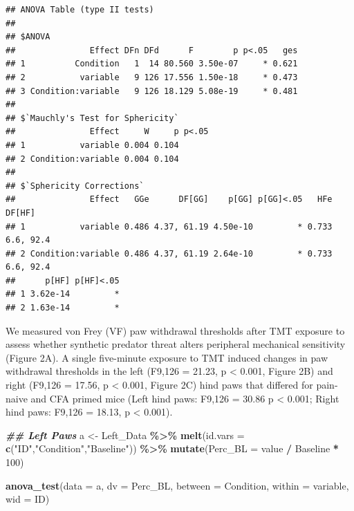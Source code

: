 \documentclass[
]{book}
\newenvironment{Shaded}{\begin{snugshade}}{\end{snugshade}}
\newcommand{\AttributeTok}[1]{\textcolor[rgb]{0.13,0.29,0.53}{#1}}
\newcommand{\DecValTok}[1]{\textcolor[rgb]{0.00,0.00,0.81}{#1}}
\newcommand{\DocumentationTok}[1]{\textcolor[rgb]{0.56,0.35,0.01}{\textbf{\textit{#1}}}}
\newcommand{\FunctionTok}[1]{\textcolor[rgb]{0.13,0.29,0.53}{\textbf{#1}}}
\newcommand{\NormalTok}[1]{#1}
\newcommand{\OtherTok}[1]{\textcolor[rgb]{0.56,0.35,0.01}{#1}}
\newcommand{\SpecialCharTok}[1]{\textcolor[rgb]{0.81,0.36,0.00}{\textbf{#1}}}
\newcommand{\StringTok}[1]{\textcolor[rgb]{0.31,0.60,0.02}{#1}}
\begin{document}
\begin{verbatim}
## ANOVA Table (type II tests)
## 
## $ANOVA
##               Effect DFn DFd      F        p p<.05   ges
## 1          Condition   1  14 80.560 3.50e-07     * 0.621
## 2           variable   9 126 17.556 1.50e-18     * 0.473
## 3 Condition:variable   9 126 18.129 5.08e-19     * 0.481
## 
## $`Mauchly's Test for Sphericity`
##               Effect     W     p p<.05
## 1           variable 0.004 0.104      
## 2 Condition:variable 0.004 0.104      
## 
## $`Sphericity Corrections`
##               Effect   GGe      DF[GG]    p[GG] p[GG]<.05   HFe    DF[HF]
## 1           variable 0.486 4.37, 61.19 4.50e-10         * 0.733 6.6, 92.4
## 2 Condition:variable 0.486 4.37, 61.19 2.64e-10         * 0.733 6.6, 92.4
##      p[HF] p[HF]<.05
## 1 3.62e-14         *
## 2 1.63e-14         *
\end{verbatim}

We measured von Frey (VF) paw withdrawal thresholds after TMT exposure to assess whether synthetic predator threat alters peripheral mechanical sensitivity (Figure 2A). A single five-minute exposure to TMT induced changes in paw withdrawal thresholds in the left (F9,126 = 21.23, p \textless{} 0.001, Figure 2B) and right (F9,126 = 17.56, p \textless{} 0.001, Figure 2C) hind paws that differed for pain-naive and CFA primed mice (Left hind paws: F9,126 = 30.86 p \textless{} 0.001; Right hind paws: F9,126 = 18.13, p \textless{} 0.001).

\begin{Shaded}
\begin{Highlighting}[]
\DocumentationTok{\#\# Left Paws}
\NormalTok{a }\OtherTok{\textless{}{-}}\NormalTok{ Left\_Data }\SpecialCharTok{\%\textgreater{}\%}
  \FunctionTok{melt}\NormalTok{(}\AttributeTok{id.vars =} \FunctionTok{c}\NormalTok{(}\StringTok{"ID"}\NormalTok{,}\StringTok{"Condition"}\NormalTok{,}\StringTok{"Baseline"}\NormalTok{)) }\SpecialCharTok{\%\textgreater{}\%}
  \FunctionTok{mutate}\NormalTok{(}\AttributeTok{Perc\_BL =}\NormalTok{ value }\SpecialCharTok{/}\NormalTok{ Baseline }\SpecialCharTok{*} \DecValTok{100}\NormalTok{) }
  
\FunctionTok{anova\_test}\NormalTok{(}\AttributeTok{data =}\NormalTok{ a, }\AttributeTok{dv =}\NormalTok{ Perc\_BL, }\AttributeTok{between =}\NormalTok{ Condition, }\AttributeTok{within =}\NormalTok{ variable, }\AttributeTok{wid =}\NormalTok{ ID)}
\end{Highlighting}
\end{Shaded}
\end{document}
